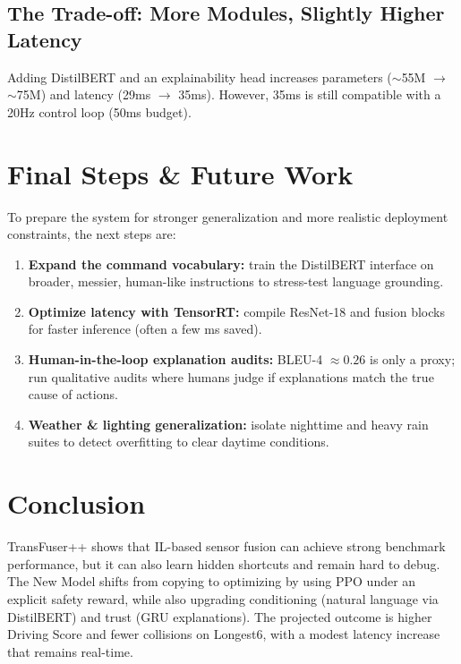\documentclass[11pt]{article}
\begin{document}
\subsection{The Trade-off: More Modules, Slightly Higher Latency}
Adding DistilBERT and an explainability head increases parameters ($\sim$55M $\rightarrow$ $\sim$75M) and latency (29ms $\rightarrow$ 35ms). However, 35ms is still compatible with a 20Hz control loop (50ms budget).

\section{Final Steps \& Future Work}

To prepare the system for stronger generalization and more realistic deployment constraints, the next steps are:

\begin{enumerate}[leftmargin=1.2em]
  \item \textbf{Expand the command vocabulary:} train the DistilBERT interface on broader, messier, human-like instructions to stress-test language grounding.
  \item \textbf{Optimize latency with TensorRT:} compile ResNet-18 and fusion blocks for faster inference (often a few ms saved).
  \item \textbf{Human-in-the-loop explanation audits:} BLEU-4 $\approx 0.26$ is only a proxy; run qualitative audits where humans judge if explanations match the true cause of actions.
  \item \textbf{Weather \& lighting generalization:} isolate nighttime and heavy rain suites to detect overfitting to clear daytime conditions.
\end{enumerate}

\section{Conclusion}

TransFuser++ shows that IL-based sensor fusion can achieve strong benchmark performance, but it can also learn hidden shortcuts and remain hard to debug. The New Model shifts from copying to optimizing by using PPO under an explicit safety reward, while also upgrading conditioning (natural language via DistilBERT) and trust (GRU explanations). The projected outcome is higher Driving Score and fewer collisions on Longest6, with a modest latency increase that remains real-time.
\end{document}
